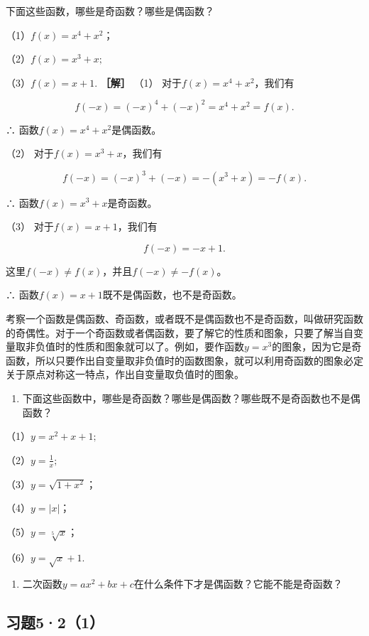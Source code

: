 下面这些函数，哪些是奇函数？哪些是偶函数？

（1）\(f(x) = x^4 + x^2\)；

（2）\(f(x) = x^{3} + x;\)

（3）\(f(x) = x + 1.\) \textbf{［解］} （1）
对于\(f(x) = x^4 + x^2\)，我们有

\[
f (- x) = (- x)^{4} + (- x)^{2} = x^{4} + x^{2} = f (x).
\]

∴ 函数\(f(x)=x^{4}+x^{2}\)是偶函数。

（2） 对于\(f(x) = x^3 + x\)，我们有

\[
f (- x) = (- x)^{3} + (- x) = - (x^{3} + x) = - f (x).
\]

∴ 函数\(f(x)=x^{3}+x\)是奇函数。

（3） 对于\(f(x) = x + 1\)，我们有

\[
f (- x) = - x + 1.
\]

这里\(f(-x) \neq f(x)\)，并且\(f(-x) \neq -f(x)\)。

∴ 函数\(f(x)=x+1\)既不是偶函数，也不是奇函数。

考察一个函数是偶函数、奇函数，或者既不是偶函数也不是奇函数，叫做研究函数的奇偶性。对于一个奇函数或者偶函数，要了解它的性质和图象，只要了解当自变量取非负值时的性质和图象就可以了。例如，要作函数\(y = x^3\)的图象，因为它是奇函数，所以只要作出自变量取非负值时的函数图象，就可以利用奇函数的图象必定关于原点对称这一特点，作出自变量取负值时的图象。

\begin{enumerate}
\item
  下面这些函数中，哪些是奇函数？哪些是偶函数？哪些既不是奇函数也不是偶函数？
\end{enumerate}

（1）\(y = x^{2} + x + 1;\)

（2）\(y = \frac{1}{x};\)

（3）\(y = \sqrt{1 + x^2}\)；

（4）\(y=|x|\)；

（5）\(y = \sqrt[5]{x}\)；

（6）\(y = \sqrt{x} + 1.\)

\begin{enumerate}[start=2]
\item
  二次函数\(y = ax^2 + bx + c\)在什么条件下才是偶函数？它能不能是奇函数？
\end{enumerate}

\subsection{习题5·2（1）}

